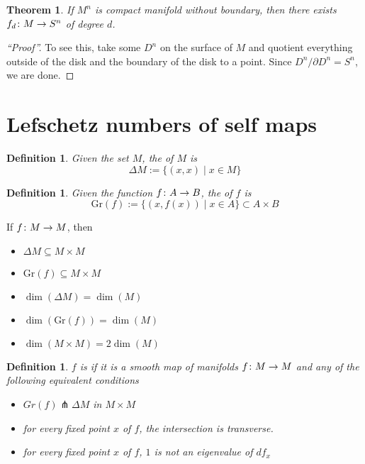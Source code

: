 \documentclass[11pt]{amsbook}
\theoremstyle{mystyle} %
\newtheorem{thrm}[thm]{Theorem}
\newtheorem{defi}[thm]{Definition}
\numberwithin{thm}{section}
\newcommand{\Gr}{\text{Gr}}
\renewcommand{\d}{\partial}
\newcommand{\transverse}{\pitchfork}
\newcommand{\x}{\times}
\begin{document}
\begin{thrm}
	If $M^n$ is compact manifold without boundary, then there exists $f_d \colon M \to S^n$ of degree $d$.
\end{thrm}
\begin{proof}[``Proof'']
  To see this, take some \(D^n\) on the surface of \(M\) and quotient
  everything outside of the disk and the boundary of the disk to a
  point. Since \(D^n / \d D^n = S^n\), we are done.
\end{proof}

\section{Lefschetz numbers of self maps}

\begin{defi}
	Given the set $M$, the  of $M$ is $$\Delta M := \{ (x,x) \mid x \in M \}$$
\end{defi}
\begin{defi}
	Given the function $f\colon A \to B$, the  of $f$
        is $$\Gr(f) := \{ (x, f(x)) \mid x \in A \} \subset A \times B$$
\end{defi}
\begin{rmk}
	If $f\colon M \to M$, then
	\begin{itemize}
		\item $\Delta M \subseteq M \x M$
		\item $\Gr(f) \subseteq M \x M$
		\item $\dim(\Delta M) = \dim(M)$
		\item $\dim(\Gr(f)) = \dim(M)$
		\item $\dim(M \x M) = 2\dim(M)$
	\end{itemize}
\end{rmk}
\begin{defi}
	$f$ is  if it is a smooth map of manifolds
        $f\colon M \to M$ and any of the following equivalent
        conditions
	\begin{itemize}
		\item $Gr(f) \transverse \Delta M$ in $M \x M$
		\item for every fixed point $x$ of $f$, the intersection is transverse.
		\item for every fixed point $x$ of $f$, $1$ is not an eigenvalue of $df_x$
	\end{itemize}
\end{defi}
\end{document}
